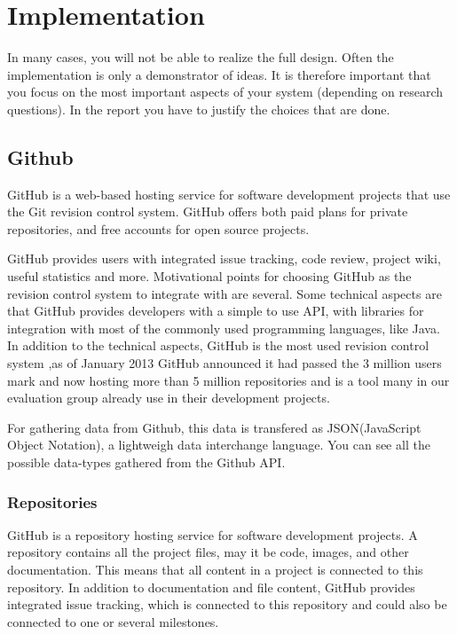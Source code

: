 \chapter{Implementation}
In many cases, you will not be able to realize the full design. Often the implementation is only a demonstrator of ideas. 
It is therefore important that you focus on the most important aspects of your system (depending on research questions). 
In the report you have to justify the choices that are done.

\section{Github}
\label{githubchapter}
GitHub is a web-based hosting service for software development projects that use the Git revision control system\cite{git,github}. GitHub offers both paid plans for private repositories, and free accounts for open source projects.

GitHub provides users with integrated issue tracking, code review, project wiki, useful statistics and more. 
Motivational points for choosing GitHub as the revision control system to integrate with are several. Some technical aspects are that GitHub provides developers with a simple to use API\cite{githubapi}, with libraries for integration with most of the commonly used programming languages, like Java\cite{jgit}.\\
In addition to the technical aspects, GitHub is the most used revision control system ,as of January 2013 GitHub announced it had passed the 3 million users mark and now hosting more than 5 million repositories and is a tool many in our evaluation group already use in their development projects\cite{githubnumbers}.

For gathering data from Github, this data is transfered as JSON(JavaScript Object Notation), a lightweigh data interchange language. You can see all the possible data-types gathered from the Github API.
\subsection{Repositories}
GitHub is a repository hosting service for software development projects. A repository contains all the project files, may it be code, images, and other documentation. This means that all content in a project is connected to this repository. In addition to documentation and file content, GitHub provides integrated issue tracking, which is connected to this repository and could also be connected to one or several milestones. 

